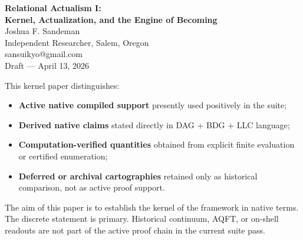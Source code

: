 \documentclass[11pt]{article}
\def\mathrm#1{#1}%
\begin{document}
\begin{center}
{\LARGE \textbf{Relational Actualism I:\\[0.3em] Kernel, Actualization, and the Engine of Becoming}}\\[1em]
{\large Joshua F. Sandeman}\\[0.25em]
{\normalsize Independent Researcher, Salem, Oregon}\\[0.15em]
{\small sansuikyo@gmail.com}\\[0.5em]
{\normalsize Draft --- April 13, 2026}
\end{center}

\begin{abstract}
Relational Actualism (RA) is a foundational physics framework built on a single ontological commitment: irreversible actualization events write permanent vertices into a growing causal directed acyclic graph filtered by the four-dimensional Benincasa--Dowker--Glaser (BDG) action. The present paper establishes the kernel in native terms: seven axioms, sequential graph growth, the BDG acceptance kernel, the local-ledger / graph-cut structure of realized partitions, the Level-1 actualization criterion $S_{\mathrm{BDG}}>0$, the kernel-locality replacement family showing that admissibility depends only on realized past, and the $d=4$ arithmetic coefficient-inversion layer. The active native Lean support surface used in the current suite pass is deliberately narrow: \texttt{RA\_GraphCore.lean}, \texttt{RA\_O01\_KernelLocality\_v2.lean}, and \texttt{RA\_O14\_ArithmeticCore\_v1.lean}. Statistical selectivity, sparse versus dense actualization regimes, finite propagation, bandwidth saturation, and the multi-criterion case for $d=4$ are developed directly from this kernel. Historical AQFT, on-shell, coupling-constant, and Lorentz/GR/QFT bridge material is not counted as active support here; where such cartographies are mentioned, they are treated as deferred or archival. Papers~II--IV extend this kernel natively into matter / motif structure, severance / cosmology, and complexity / life.
\end{abstract}

\begin{tcolorbox}[title=Epistemic Status of This Paper,colback=gray!5,colframe=gray!60]
This kernel paper distinguishes:
\begin{itemize}[nosep]
    \item \textbf{Active native compiled support} presently used positively in the suite;
    \item \textbf{Derived native claims} stated directly in DAG + BDG + LLC language;
    \item \textbf{Computation-verified quantities} obtained from explicit finite evaluation or certified enumeration;
    \item \textbf{Deferred or archival cartographies} retained only as historical comparison, not as active proof support.
\end{itemize}
The aim of this paper is to establish the kernel of the framework in native terms. The discrete statement is primary. Historical continuum, AQFT, or on-shell readouts are not part of the active proof chain in the current suite pass.
\end{tcolorbox}
\end{document}
